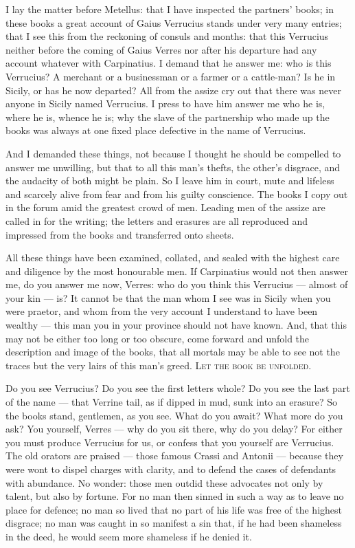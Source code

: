  I lay the matter before Metellus: that I have inspected the partners' books; in these books a great account of Gaius Verrucius stands under very many entries; that I see this from the reckoning of consuls and months: that this Verrucius neither before the coming of Gaius Verres nor after his departure had any account whatever with Carpinatius. I demand that he answer me: who is this Verrucius? A merchant or a businessman or a farmer or a cattle-man? Is he in Sicily, or has he now departed? All from the assize cry out that there was never anyone in Sicily named Verrucius. I press to have him answer me who he is, where he is, whence he is; why the slave of the partnership who made up the books was always at one fixed place defective in the name of Verrucius.

 And I demanded these things, not because I thought he should be compelled to answer me unwilling, but that to all this man's thefts, the other's disgrace, and the audacity of both might be plain. So I leave him in court, mute and lifeless and scarcely alive from fear and from his guilty conscience. The books I copy out in the forum amid the greatest crowd of men. Leading men of the assize are called in for the writing; the letters and erasures are all reproduced and impressed from the books and transferred onto sheets.

 All these things have been examined, collated, and sealed with the highest care and diligence by the most honourable men. If Carpinatius would not then answer me, do you answer me now, Verres: who do you think this Verrucius --- almost of your kin --- is? It cannot be that the man whom I see was in Sicily when you were praetor, and whom from the very account I understand to have been wealthy --- this man you in your province should not have known. And, that this may not be either too long or too obscure, come forward and unfold the description and image of the books, that all mortals may be able to see not the traces but the very lairs of this man's greed. \textsc{Let the book be unfolded}.

 Do you see Verrucius? Do you see the first letters whole? Do you see the last part of the name --- that Verrine tail, as if dipped in mud, sunk into an erasure? So the books stand, gentlemen, as you see. What do you await? What more do you ask? You yourself, Verres --- why do you sit there, why do you delay? For either you must produce Verrucius for us, or confess that you yourself are Verrucius. The old orators are praised --- those famous Crassi and Antonii --- because they were wont to dispel charges with clarity, and to defend the cases of defendants with abundance. No wonder: those men outdid these advocates not only by talent, but also by fortune. For no man then sinned in such a way as to leave no place for defence; no man so lived that no part of his life was free of the highest disgrace; no man was caught in so manifest a sin that, if he had been shameless in the deed, he would seem more shameless if he denied it.

